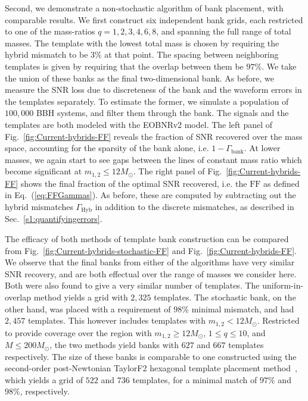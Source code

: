 \documentclass[aps,
prd,
twocolumn,
superscriptaddress,
lengthcheck,showpacs,letterpaper,nofootinbib,
floatfix]{revtex4-1}
\newcommand{\Hyb}{\mathrm{Hyb}}
\newcommand{\FF}{\mathrm{FF}}
\begin{document}
Second, we demonstrate a non-stochastic algorithm of bank placement, with 
comparable results. We first construct six independent bank grids, each
restricted to one of the mass-ratios $q=1,2,3,4,6,8$, and spanning the full 
range of total masses. The template with the lowest total mass is chosen 
by requiring the hybrid mismatch to be $3\%$ at that point.
The spacing between neighboring templates is
given by requiring that the overlap between them be $97\%$. 
We take the union of these banks as the final 
two-dimensional bank. As before, we measure the SNR loss due to discreteness of
the bank and the waveform errors in the templates separately. To estimate the
former, we simulate a population of $100,000$ BBH systems, and filter
them through the bank. The signals and the templates are both modeled
with the EOBNRv2 model. The left panel of Fig.~\ref{fig:Current-hybrids-FF}
reveals the fraction of SNR recovered over the mass space, accounting for the 
sparsity of the bank alone, i.e. $1-\Gamma_\mathrm{bank}$. At lower masses, 
we again start to see gaps between the lines of constant mass ratio which
become significant at $m_{1,2} \leq 12M_\odot$. 
The right panel of Fig.~\ref{fig:Current-hybrids-FF} shows the final fraction 
of the optimal SNR recovered, i.e. the $\FF$ as defined in Eq.~(\ref{eq:FFGammas}). 
As before, these are computed by subtracting out the hybrid mismatches 
$\Gamma_\Hyb$ in addition to the discrete mismatches, as described in
Sec.~\ref{s1:quantifyingerrors}. 

The efficacy of both methods of template bank construction
can be compared from Fig.~\ref{fig:Current-hybrids-stochastic-FF} and 
Fig.~\ref{fig:Current-hybrids-FF}. We observe that the final banks from either
of the algorithms have very similar SNR recovery, and are both effectual over
the range of masses we consider here. Both were also found to give a very 
similar number of templates. The uniform-in-overlap method yields a grid 
with $2,325$ templates. The stochastic bank, on the other hand, was placed with a
requirement of $98\%$ minimal mismatch, and had $2,457$ templates. 
This however includes templates with $m_{1,2} < 12M_\odot$. Restricted
to provide coverage over the region with $m_{1,2}\geq 12M_\odot$, $1\leq q\leq 10$,
and $M\leq 200M_\odot$, the two methods yield banks with $627$ and $667$
templates respectively. The size of these banks is comparable to one 
constructed using the second-order post-Newtonian TaylorF2 hexagonal 
template placement method~\cite{SathyaBankPlacementTauN,BabaketalBankPlacement,
SathyaMetric2PN,Cokelaer:2007kx}, 
which yields a grid of $522$ and $736$ templates, for a minimal
match of $97\%$ and $98\%$, respectively.
\end{document}
